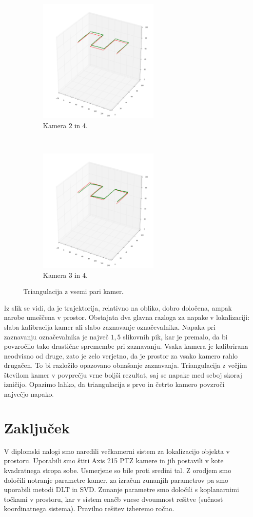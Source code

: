 \documentclass[a4paper, 12pt]{book}
\begin{document}
\begin{figure}
    \begin{subfigure}[t]{0.5\textwidth}
        \centering
        \includegraphics[width=6cm]{24.png}
        \caption{Kamera 2 in 4.}
    \end{subfigure}~
    \begin{subfigure}[t]{0.5\textwidth}
        \centering
        \includegraphics[width=6cm]{34.png}
        \caption{Kamera 3 in 4.}
    \end{subfigure}
    \caption{Triangulacija z vsemi pari kamer.}
\end{figure}

Iz slik se vidi, da je trajektorija, relativno na obliko, dobro določena, ampak narobe umeščena v prostor. Obstajata dva glavna razloga za napake v lokalizaciji: slaba kalibracija kamer ali slabo zaznavanje označevalnika. Napaka pri zaznavanju označevalnika je največ $1,5$ slikovnih pik, kar je premalo, da bi povzročilo tako drastične spremembe pri zaznavanju. Vsaka kamera je kalibrirana neodvisno od druge, zato je zelo verjetno, da je prostor za vsako kamero rahlo drugačen. To bi razložilo opazovano obnašanje zaznavanja. Triangulacija z večjim številom kamer v povprečju vrne boljši rezultat, saj se napake med seboj skoraj izničijo. Opazimo lahko, da triangulacija s prvo in četrto kamero povzroči največjo napako. 

\chapter{Zaključek}
V diplomski nalogi smo naredili večkamerni sistem za lokalizacijo objekta v prostoru. Uporabili smo štiri Axis 215 PTZ kamere in jih postavili v kote kvadratnega stropa sobe. Usmerjene so bile proti sredini tal. Z orodjem smo določili notranje parametre kamer, za izračun zunanjih parametrov pa smo uporabili metodi DLT in SVD. Zunanje parametre smo določili s koplanarnimi točkami v prostoru, kar v sistem enačb vnese dvoumnost rešitve (sučnost koordinatnega sistema). Pravilno rešitev izberemo ročno. 
\end{document}
